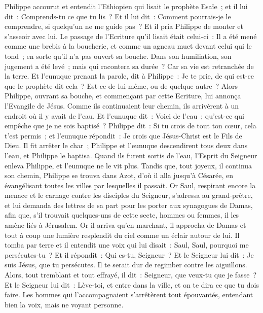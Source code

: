 \begin{multicols}{2}
Philippe accourut et entendit l'Ethiopien qui lisait le prophète Esaïe~; et il lui dit~: Comprends-tu ce que tu lis~?
Et il lui dit~: Comment pourrais-je le comprendre, si quelqu'un ne me guide pas~? Et il pria Philippe de monter et s'asseoir avec lui.
Le passage de l'Ecriture qu'il lisait était celui-ci~: Il a été mené comme une brebis à la boucherie, et comme un agneau muet devant celui qui le tond~; en sorte qu'il n'a pas ouvert sa bouche.
Dans son humiliation, son jugement a été levé~; mais qui racontera sa durée~? Car sa vie est retranchée de la terre.
Et l'eunuque prenant la parole, dit à Philippe~: Je te prie, de qui est-ce que le prophète dit cela~? Est-ce de lui-même, ou de quelque autre~?
Alors Philippe, ouvrant sa bouche, et commençant par cette Ecriture, lui annonça l'Evangile de Jésus.
Comme ils continuaient leur chemin, ils arrivèrent à un endroit où il y avait de l'eau. Et l'eunuque dit~: Voici de l'eau~; qu'est-ce qui empêche que je ne sois baptisé~?
Philippe dit~: Si tu crois de tout ton cœur, cela t'est permis~; et l'eunuque répondit~: Je crois que Jésus-Christ est le Fils de Dieu.
Il fit arrêter le char~; Philippe et l'eunuque descendirent tous deux dans l'eau, et Philippe le baptisa.
Quand ils furent sortis de l'eau, l'Esprit du Seigneur enleva Philippe, et l'eunuque ne le vit plus. Tandis que, tout joyeux, il continua son chemin,
Philippe se trouva dans Azot, d'où il alla jusqu'à Césarée, en évangélisant toutes les villes par lesquelles il passait.
\VerseOne{}Or Saul, respirant encore la menace et le carnage contre les disciples du Seigneur, s'adressa au grand-prêtre,
et lui demanda des lettres de sa part pour les porter aux synagogues de Damas, afin que, s'il trouvait quelques-uns de cette secte, hommes ou femmes, il les amène liés à Jérusalem.
Or il arriva qu'en marchant, il approcha de Damas et tout à coup une lumière resplendit du ciel comme un éclair autour de lui.
Il tomba par terre et il entendit une voix qui lui disait~: Saul, Saul, pourquoi me persécutes-tu~?
Et il répondit~: Qui es-tu, Seigneur~? Et le Seigneur lui dit~: Je suis Jésus, que tu persécutes. Il te serait dur de regimber contre les aiguillons.
Alors, tout tremblant et tout effrayé, il dit~: Seigneur, que veux-tu que je fasse~? Et le Seigneur lui dit~: Lève-toi, et entre dans la ville, et on te dira ce que tu dois faire.
Les hommes qui l'accompagnaient s'arrêtèrent tout épouvantés, entendant bien la voix, mais ne voyant personne.

\end{multicols}
